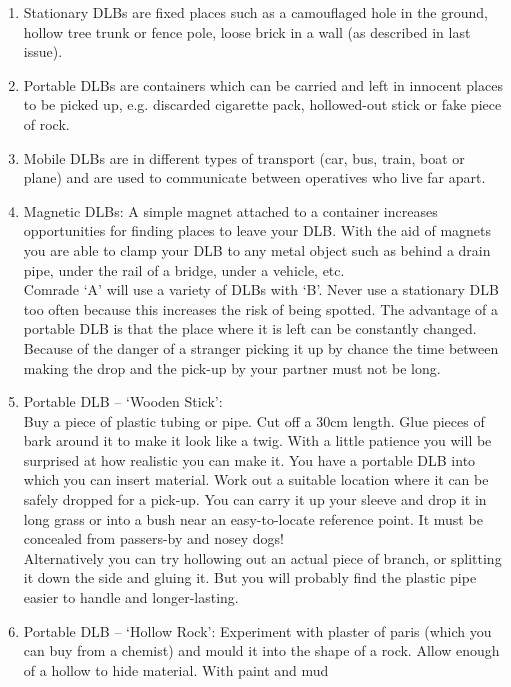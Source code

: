 \begin{enumerate}
\tightlist
\item
  {Stationary DLBs} are fixed places such as a camouflaged hole in the
  ground, hollow tree trunk or fence pole, loose brick in a wall (as
  described in last issue).
\item
  {Portable DLBs} are containers which can be carried and left in
  innocent places to be picked up, e.g. discarded cigarette pack,
  hollowed-out stick or fake piece of rock.
\item
  {Mobile DLBs} are in different types of transport (car, bus, train,
  boat or plane) and are used to communicate between operatives who live
  far apart.
\item
  {Magnetic DLBs:} A simple magnet attached to a container increases
  opportunities for finding places to leave your DLB. With the aid of
  magnets you are able to clamp your DLB to any metal object such as
  behind a drain pipe, under the rail of a bridge, under a vehicle,
  etc.\\
   Comrade `A' will use a variety of DLBs with `B'. Never use a
  stationary DLB too often because this increases the risk of being
  spotted. The advantage of a portable DLB is that the place where it is
  left can be constantly changed. Because of the danger of a stranger
  picking it up by chance the time between making the drop and the
  pick-up by your partner must not be long.
\item
  {Portable DLB} -- `Wooden Stick':\\
   Buy a piece of plastic tubing or pipe. Cut off a 30cm length. Glue
  pieces of bark around it to make it look like a twig. With a little
  patience you will be surprised at how realistic you can make it. You
  have a portable DLB into which you can insert material. Work out a
  suitable location where it can be safely dropped for a pick-up. You
  can carry it up your sleeve and drop it in long grass or into a bush
  near an easy-to-locate reference point. It must be concealed from
  passers-by and nosey dogs!\\
   Alternatively you can try hollowing out an actual piece of branch, or
  splitting it down the side and gluing it. But you will probably find
  the plastic pipe easier to handle and longer-lasting.
\item
  {Portable DLB } -- `Hollow Rock': Experiment with plaster of paris
  (which you can buy from a chemist) and mould it into the shape of a
  rock. Allow enough of a hollow to hide material. With paint and mud

\end{enumerate}
